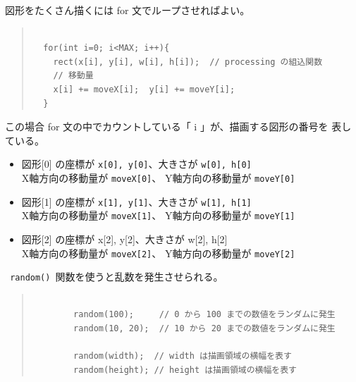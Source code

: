 \documentclass[uplatex,a4j,11pt]{jsarticle}
\renewcommand{\baselinestretch}{1.08}
\begin{document}
図形をたくさん描くには for 文でループさせればよい。

    \begin{quote}
	\begin{minipage}{\linewidth}
	 \begin{shadebox}
      \def\baselinestretch{.8}\selectfont
      \small
      \begin{verbatim}

  for(int i=0; i<MAX; i++){
    rect(x[i], y[i], w[i], h[i]);  // processing の組込関数
    // 移動量
    x[i] += moveX[i];  y[i] += moveY[i];
  }
      \end{verbatim}
	 \end{shadebox} 
	 \end{minipage}
	\end{quote}

    この場合 for 文の中でカウントしている「 i 」が、描画する図形の番号を
    表している。
    \begin{itemize}
     \item 図形[0] の座標が \verb|x[0], y[0]|、大きさが \verb|w[0], h[0]|\\
           X軸方向の移動量が \verb|moveX[0]|、 Y軸方向の移動量が \verb|moveY[0]|

     \item 図形[1] の座標が \verb|x[1], y[1]|、大きさが \verb|w[1], h[1]|\\
           X軸方向の移動量が \verb|moveX[1]|、 Y軸方向の移動量が \verb|moveY[1]|
     \item 図形[2] の座標が x[2], y[2]、大きさが w[2], h[2]\\
           X軸方向の移動量が \verb|moveX[2]|、 Y軸方向の移動量が
           \verb|moveY[2]|
    \end{itemize}



    \verb| random() |関数を使うと乱数を発生させられる。

    \begin{quote}
	\begin{minipage}{\linewidth}
      \def\baselinestretch{.8}\selectfont
      \small
      \begin{verbatim}

        random(100);     // 0 から 100 までの数値をランダムに発生
        random(10, 20);  // 10 から 20 までの数値をランダムに発生

        random(width);  // width は描画領域の横幅を表す
        random(height); // height は描画領域の横幅を表す
      \end{verbatim}
	 \end{minipage}
	\end{quote}
\end{document}
